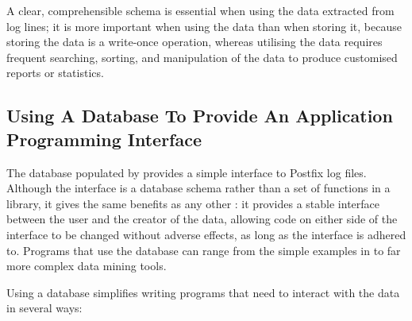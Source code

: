 A clear, comprehensible schema is essential when using the data extracted
from log lines; it is more important when using the data than when storing
it, because storing the data is a write-once operation, whereas utilising
the data requires frequent searching, sorting, and manipulation of the data
to produce customised reports or statistics.

\subsection{Using A Database To Provide An Application Programming Interface}

\label{database as API}

The database populated by \parsername{} provides a simple interface to
Postfix log files.  Although the interface is a database schema rather than
a set of functions in a library, it gives the same benefits as any other
: it provides a stable interface between the user and the
creator of the data, allowing code on either side of the interface to be
changed without adverse effects, as long as the interface is adhered to.
Programs that use the database can range from the simple examples in
 to far more complex data mining tools.

Using a database simplifies writing programs that need to interact with the
data in several ways:

